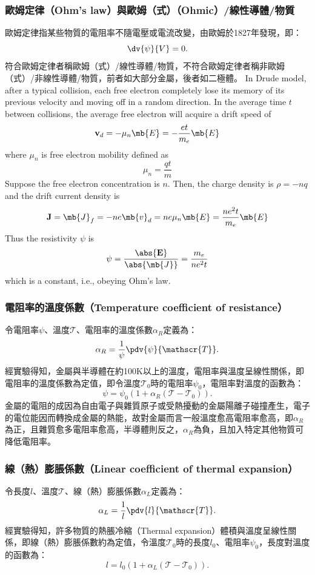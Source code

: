 \documentclass[a4paper,12pt]{report}
\begin{document}
\begin{itemize}
\subsubsection{歐姆定律（Ohm's law）與歐姆（式）（Ohmic）/線性導體/物質}
歐姆定律指某些物質的電阻率不隨電壓或電流改變，由歐姆於1827年發現，即：
\[\dv{\psi}{V}=0.\]
符合歐姆定律者稱歐姆（式）/線性導體/物質，不符合歐姆定律者稱非歐姆（式）/非線性導體/物質，前者如大部分金屬，後者如二極體。
In Drude model, after a typical collision, each free electron completely lose its memory of its previous velocity and moving off in a random direction. In the average time $t$ between collisions, the average free electron will acquire a drift speed of
\[\mathbf{v}_d=-\mu_n\mb{E}=-\frac{et}{m_e}\mb{E}\]
where $\mu_n$ is free electron mobility defined as
\[\mu_n=\frac{qt}{m}\]
Suppose the free electron concentration is $n$. Then, the charge density is $\rho=-nq$ and the drift current density is
\[\mathbf{J}=\mb{J}_f=-ne\mb{v}_d=ne\mu_n\mb{E}=\frac{ne^2t}{m_e}\mb{E}\]
Thus the resistivity $\psi$ is
\[\psi=\frac{\abs{\mathbf{E}}}{\abs{\mb{J}}}=\frac{m_e}{ne^2t}\]
which is a constant, i.e., obeying Ohm's law.
\subsubsection{電阻率的溫度係數（Temperature coefficient of resistance）}
令電阻率$\psi$、溫度$\mathscr{T}$、電阻率的溫度係數$\alpha_R$定義為：
\[\alpha_R=\frac{1}{\psi}\pdv{\psi}{\mathscr{T}}.\]
經實驗得知，金屬與半導體在約100K以上的溫度，電阻率與溫度呈線性關係，即電阻率的溫度係數為定值，即令溫度$\mathscr{T}_0$時的電阻率$\psi_0$，電阻率對溫度的函數為：
\[\psi=\psi_0(1+\alpha_R(\mathscr{T}-\mathscr{T}_0)).\]
金屬的電阻的成因為自由電子與雜質原子或受熱擾動的金屬陽離子碰撞產生，電子的電位能因而轉換成金屬的熱能，故對金屬而言一般溫度愈高電阻率愈高，即$\alpha_R$為正，且雜質愈多電阻率愈高，半導體則反之，$\alpha_R$為負，且加入特定其他物質可降低電阻率。
\subsubsection{線（熱）膨脹係數（Linear coefficient of thermal expansion）}
令長度$l$、溫度$\mathscr{T}$、線（熱）膨脹係數$\alpha_L$定義為：
\[\alpha_L=\frac{1}{l}\pdv{l}{\mathscr{T}}.\]
經實驗得知，許多物質的熱脹冷縮（Thermal expansion）體積與溫度呈線性關係，即線（熱）膨脹係數約為定值，令溫度$\mathscr{T}_0$時的長度$l_0$、電阻率$\psi_0$，長度對溫度的函數為：
\[ l= l_0(1+\alpha_L(\mathscr{T}-\mathscr{T}_0)).\]

\end{itemize}
\end{document}
